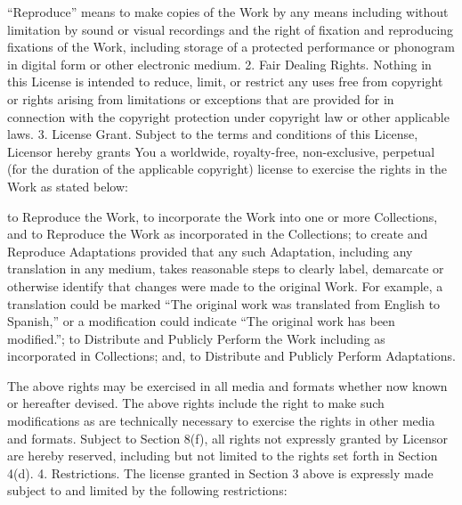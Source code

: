 \documentclass[oneside]{book}
\begin{document}
``Reproduce'' means to make copies of the Work by any means including without
limitation by sound or visual recordings and the right of fixation and
reproducing fixations of the Work, including storage of a protected performance
or phonogram in digital form or other electronic medium.
2. Fair Dealing Rights.
Nothing in this License is intended to reduce, limit, or restrict any uses free
from copyright or rights arising from limitations or exceptions that are
provided for in connection with the copyright protection under copyright law or
other applicable laws.
3. License Grant.
Subject to the terms and conditions of this License, Licensor hereby grants You
a worldwide, royalty-free, non-exclusive, perpetual (for the duration of the
applicable copyright) license to exercise the rights in the Work as stated below:

to Reproduce the Work, to incorporate the Work into one or more Collections, and
to Reproduce the Work as incorporated in the Collections;
to create and Reproduce Adaptations provided that any such Adaptation, including
any translation in any medium, takes reasonable steps to clearly label,
demarcate or otherwise identify that changes were made to the original Work. For
example, a translation could be marked ``The original work was translated from
English to Spanish,'' or a modification could indicate ``The original work has
been modified.'';
to Distribute and Publicly Perform the Work including as incorporated in
Collections; and,
to Distribute and Publicly Perform Adaptations.

The above rights may be exercised in all media and formats whether now known or
hereafter devised. The above rights include the right to make such modifications
as are technically necessary to exercise the rights in other media and
formats. Subject to Section 8(f), all rights not expressly granted by Licensor
are hereby reserved, including but not limited to the rights set forth in
Section 4(d).
4. Restrictions.
The license granted in Section 3 above is expressly made subject to and limited
by the following restrictions:
\end{document}
